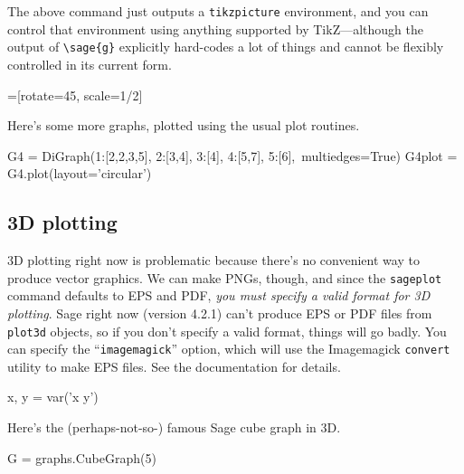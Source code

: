 \documentclass{article}
\begin{document}
\begin{center}
\end{center}

The above command just outputs a \texttt{tikzpicture} environment, and
you can control that environment using anything supported by
TikZ---although the output of \verb|\sage{g}| explicitly hard-codes a
lot of things and cannot be flexibly controlled in its current form.

=[rotate=45, scale=1/2]

\begin{center}
\end{center}

Here's some more graphs, plotted using the usual plot routines.


\begin{sageblock}
G4 = DiGraph({1:[2,2,3,5], 2:[3,4], 3:[4], 4:[5,7], 5:[6]},\
             multiedges=True)
G4plot = G4.plot(layout='circular')
\end{sageblock}


\subsection{3D plotting}

3D plotting right now is problematic because there's no convenient way
to produce vector graphics. We can make PNGs, though, and since the
\verb|sageplot| command defaults to EPS and PDF, \emph{you must specify
  a valid format for 3D plotting}. Sage right now (version 4.2.1) can't
produce EPS or PDF files from \texttt{plot3d} objects, so if you don't
specify a valid format, things will go badly. You can specify the
``\texttt{imagemagick}'' option, which will use the Imagemagick
\texttt{convert} utility to make EPS files. See the documentation for
details.


\begin{sagesilent}
  x, y = var('x y')
\end{sagesilent}


Here's the (perhaps-not-so-) famous Sage cube graph in 3D.

\begin{sageblock}
  G = graphs.CubeGraph(5)
\end{sageblock}
\end{document}

